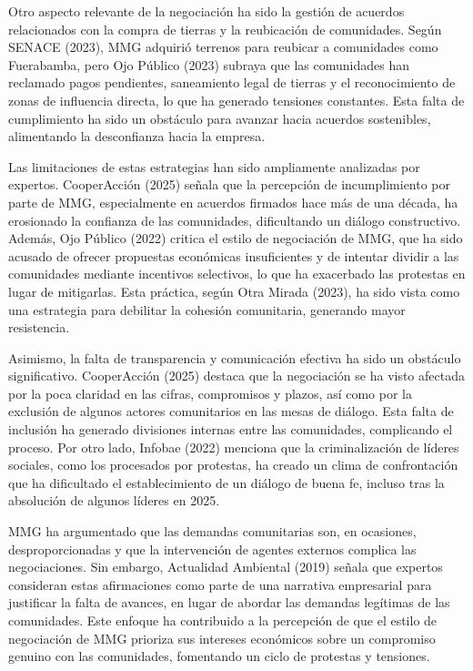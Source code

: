 \documentclass[
  stu,
  floatsintext,
  longtable,
  a4paper,
  nolmodern,
  notxfonts,
  notimes,
  colorlinks=true,linkcolor=blue,citecolor=blue,urlcolor=blue]{apa7}
\begin{document}
Otro aspecto relevante de la negociación ha sido la gestión de acuerdos
relacionados con la compra de tierras y la reubicación de comunidades.
Según SENACE (2023), MMG adquirió terrenos para reubicar a comunidades
como Fuerabamba, pero Ojo Público (2023) subraya que las comunidades han
reclamado pagos pendientes, saneamiento legal de tierras y el
reconocimiento de zonas de influencia directa, lo que ha generado
tensiones constantes. Esta falta de cumplimiento ha sido un obstáculo
para avanzar hacia acuerdos sostenibles, alimentando la desconfianza
hacia la empresa.

Las limitaciones de estas estrategias han sido ampliamente analizadas
por expertos. CooperAcción (2025) señala que la percepción de
incumplimiento por parte de MMG, especialmente en acuerdos firmados hace
más de una década, ha erosionado la confianza de las comunidades,
dificultando un diálogo constructivo. Además, Ojo Público (2022) critica
el estilo de negociación de MMG, que ha sido acusado de ofrecer
propuestas económicas insuficientes y de intentar dividir a las
comunidades mediante incentivos selectivos, lo que ha exacerbado las
protestas en lugar de mitigarlas. Esta práctica, según Otra Mirada
(2023), ha sido vista como una estrategia para debilitar la cohesión
comunitaria, generando mayor resistencia.

Asimismo, la falta de transparencia y comunicación efectiva ha sido un
obstáculo significativo. CooperAcción (2025) destaca que la negociación
se ha visto afectada por la poca claridad en las cifras, compromisos y
plazos, así como por la exclusión de algunos actores comunitarios en las
mesas de diálogo. Esta falta de inclusión ha generado divisiones
internas entre las comunidades, complicando el proceso. Por otro lado,
Infobae (2022) menciona que la criminalización de líderes sociales, como
los procesados por protestas, ha creado un clima de confrontación que ha
dificultado el establecimiento de un diálogo de buena fe, incluso tras
la absolución de algunos líderes en 2025.

MMG ha argumentado que las demandas comunitarias son, en ocasiones,
desproporcionadas y que la intervención de agentes externos complica las
negociaciones. Sin embargo, Actualidad Ambiental (2019) señala que
expertos consideran estas afirmaciones como parte de una narrativa
empresarial para justificar la falta de avances, en lugar de abordar las
demandas legítimas de las comunidades. Este enfoque ha contribuido a la
percepción de que el estilo de negociación de MMG prioriza sus intereses
económicos sobre un compromiso genuino con las comunidades, fomentando
un ciclo de protestas y tensiones.
\end{document}
